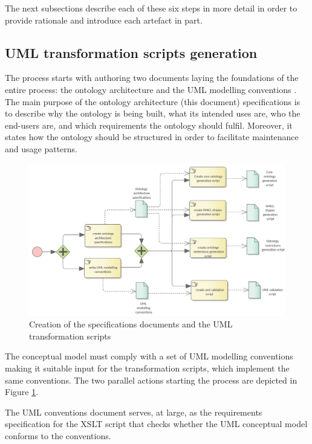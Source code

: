	The next subsections describe each of these six steps in more detail in order to provide rationale and introduce each artefact in part.
	
	\subsection{UML transformation scripts generation}
	\label{sec:uml-transformation}
	
	The process starts with authoring two documents laying the foundations of the entire process: the ontology architecture and the UML modelling conventions \citep{costetchi2020b}. The main purpose of the ontology architecture (this document) specifications is to describe why the ontology is being built, what its intended uses are, who the end-users are, and which requirements the ontology should fulfil. Moreover, it states how the ontology should be structured in order to facilitate maintenance and usage patterns.
	
	
	\begin{figure}[!ht]		
		\centering
		\includegraphics[width=\textwidth]{../img/uml2formalScriptCreation.png}
		\caption{Creation of the specifications documents and the UML transformation scripts}
		\label{fig:uml-transformation}
	\end{figure}
	
	The conceptual model must comply with a set of UML modelling conventions making it suitable input for the transformation scripts, which implement the same conventions. The two parallel actions starting the process are depicted in Figure \ref{fig:uml-transformation}.
		
	The UML conventions document serves, at large, as the requirements specification for the XSLT script that checks whether the UML conceptual model conforms to the conventions.
	
